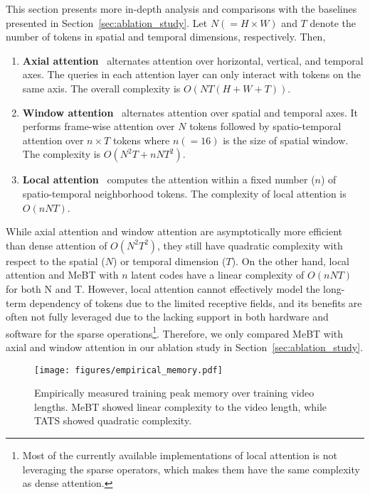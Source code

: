 \documentclass[10pt,twocolumn,letterpaper]{article}
\begin{document}
This section presents more in-depth analysis and comparisons with the baselines presented in Section~\ref{sec:ablation_study}.
Let $N(=H\times W)$ and $T$ denote the number of tokens in spatial and temporal dimensions, respectively. Then,
\begin{enumerate}
    \item {\bf Axial attention}~\cite{Ho2019} alternates attention over horizontal, vertical, and temporal axes. 
    The queries in each attention layer can only interact with tokens on the same axis. 
    The overall complexity is $O(NT(H+W+T))$.
    \item {\bf Window attention}~\cite{MaskViT} alternates attention over spatial and temporal axes. It performs frame-wise attention over $N$ tokens followed by spatio-temporal attention over $n\times T$ tokens where $n(=16)$ is the size of spatial window. The complexity is $O(N^2T+nNT^2)$.
    \vspace{-0.4cm}
    \item {\bf Local attention}~\cite{NUWA} computes the attention within a fixed number ($n$) of spatio-temporal neighborhood tokens. The complexity of local attention is $O(nNT)$.
\end{enumerate}


While axial attention and window attention are asymptotically more efficient than dense attention of $O(N^2T^2)$, they still have quadratic complexity with respect to the spatial ($N$) or temporal dimension ($T$). On the other hand, local attention and MeBT with $n$ latent codes have a linear complexity of $O(nNT)$ for both N and T. 
However, local attention cannot effectively model the long-term dependency of tokens due to the limited receptive fields, and its benefits are often not fully leveraged due to the lacking support in both hardware and software for the sparse operations\footnote{Most of the currently available implementations of local attention is not leveraging the sparse operators, which makes them have the same complexity as dense attention.}. Therefore, we only compared MeBT with axial and window attention in our ablation study in Section~\ref{sec:ablation_study}.










\begin{figure}[t]
    \centering
    \texttt{[image: figures/empirical\_memory.pdf]}
    \caption{Empirically measured training peak memory over training video lengths. MeBT showed linear complexity to the video length, while TATS showed quadratic complexity.}
    \label{fig:memory_comparison}
\end{figure}
\end{document}
